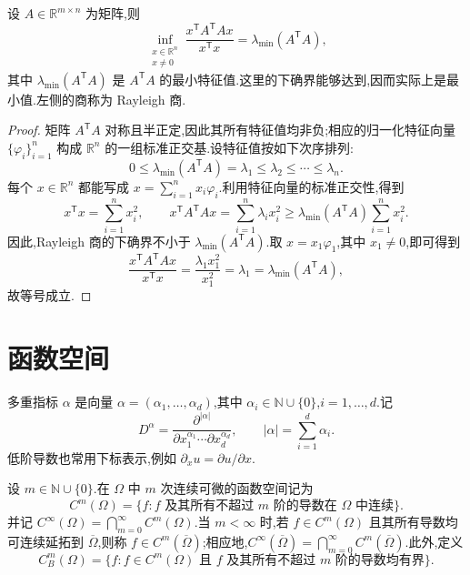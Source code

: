 \begin{lemma}\label{lem:appendix-a-19}
设 $A\in\mathbb R^{m\times n}$ 为矩阵,则
\[
 \inf_{\substack{x\in\mathbb R^n\\x\ne0}}
 \frac{x^{\mathsf T}A^{\mathsf T}Ax}{x^{\mathsf T}x}
 =\lambda_{\min}(A^{\mathsf T}A),
\]
其中 $\lambda_{\min}(A^{\mathsf T}A)$ 是 $A^{\mathsf T}A$ 的最小特征值.这里的下确界能够达到,因而实际上是最小值.左侧的商称为 Rayleigh 商.
\end{lemma}
\begin{proof}
矩阵 $A^{\mathsf T}A$ 对称且半正定,因此其所有特征值均非负;相应的归一化特征向量 $\{\varphi_i\}_{i=1}^n$ 构成 $\mathbb R^n$ 的一组标准正交基.设特征值按如下次序排列:
\[
 0\le\lambda_{\min}(A^{\mathsf T}A)=\lambda_1\le\lambda_2\le\cdots\le\lambda_n.
\]
每个 $x\in\mathbb R^n$ 都能写成 $x=\sum_{i=1}^n x_i\varphi_i$.利用特征向量的标准正交性,得到
\[
 x^{\mathsf T}x=\sum_{i=1}^n x_i^2,
 \qquad
 x^{\mathsf T}A^{\mathsf T}Ax
 =\sum_{i=1}^n\lambda_i x_i^2
 \ge\lambda_{\min}(A^{\mathsf T}A)\sum_{i=1}^n x_i^2.
\]
因此,Rayleigh 商的下确界不小于 $\lambda_{\min}(A^{\mathsf T}A)$.取 $x=x_1\varphi_1$,其中 $x_1\ne0$,即可得到
\[
 \frac{x^{\mathsf T}A^{\mathsf T}Ax}{x^{\mathsf T}x}
 =\frac{\lambda_1x_1^2}{x_1^2}
 =\lambda_1=\lambda_{\min}(A^{\mathsf T}A),
\]
故等号成立.
\end{proof}


\section{函数空间}\label{sec:appendix-a-function-spaces}

\begin{definition}[导数与多重指标]\label{def:appendix-a-20}
多重指标 $\alpha$ 是向量 $\alpha=(\alpha_1,\ldots,\alpha_d)$,其中 $\alpha_i\in\mathbb N\cup\{0\}$,$i=1,\ldots,d$.记
\[
 D^\alpha=\frac{\partial^{|\alpha|}}{\partial x_1^{\alpha_1}\cdots\partial x_d^{\alpha_d}},
 \qquad |\alpha|=\sum_{i=1}^d\alpha_i.
\]
低阶导数也常用下标表示,例如 $\partial_x u=\partial u/\partial x$.
\end{definition}

\begin{definition}\label{def:appendix-a-21}
设 $m\in\mathbb N\cup\{0\}$.在 $\Omega$ 中 $m$ 次连续可微的函数空间记为
\[
 C^m(\Omega)=\{f:f\text{ 及其所有不超过 }m\text{ 阶的导数在 }\Omega\text{ 中连续}\}.
\]
并记 $C^\infty(\Omega)=\bigcap_{m=0}^\infty C^m(\Omega)$.当 $m<\infty$ 时,若 $f\in C^m(\Omega)$ 且其所有导数均可连续延拓到 $\overline\Omega$,则称 $f\in C^m(\overline\Omega)$;相应地,$C^\infty(\overline\Omega)=\bigcap_{m=0}^\infty C^m(\overline\Omega)$.此外,定义
\begin{equation}\label{eq:appendix-a-6}
 C_B^m(\Omega)=\{f:f\in C^m(\Omega)\text{ 且 }f\text{ 及其所有不超过 }m\text{ 阶的导数均有界}\}.
\end{equation}
\end{definition}

